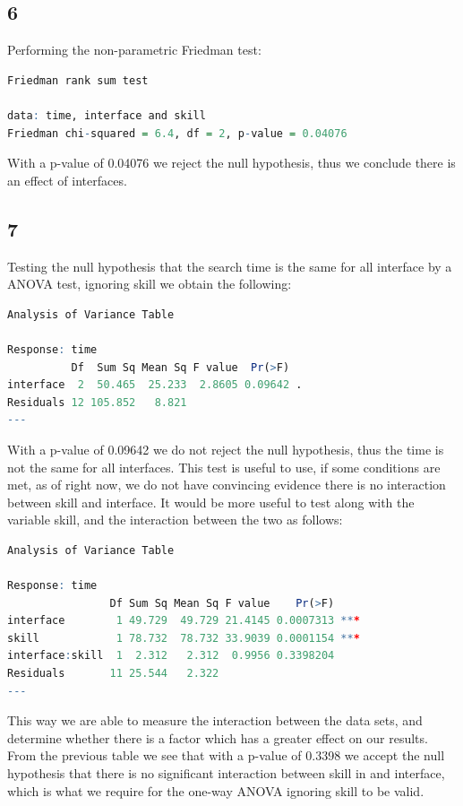 \documentclass{article}
\begin{document}
    \subsection*{6}
    
    Performing the non-parametric Friedman test:
	\begin{lstlisting}[language=R]
Friedman rank sum test

data: time, interface and skill
Friedman chi-squared = 6.4, df = 2, p-value = 0.04076
	\end{lstlisting}
	With a p-value of 0.04076 we reject the null hypothesis, thus we conclude there is an effect of interfaces.
    \subsection*{7}
    Testing the null hypothesis that the search time is the same for all interface by a ANOVA test, ignoring skill we obtain the following:
    \begin{lstlisting}[language=R]
    Analysis of Variance Table

Response: time
          Df  Sum Sq Mean Sq F value  Pr(>F)  
interface  2  50.465  25.233  2.8605 0.09642 .
Residuals 12 105.852   8.821                  
---
	\end{lstlisting}
	With a p-value of 0.09642 we do not reject the null hypothesis, thus the time is not the same for all interfaces.
	This test is useful to use, if some conditions are met, as of right now, we do not have convincing evidence there is no interaction between skill and interface. It would be more useful to test along with the variable skill, and the interaction between the two as follows:
	    \begin{lstlisting}[language=R]
	Analysis of Variance Table

Response: time
                Df Sum Sq Mean Sq F value    Pr(>F)    
interface        1 49.729  49.729 21.4145 0.0007313 ***
skill            1 78.732  78.732 33.9039 0.0001154 ***
interface:skill  1  2.312   2.312  0.9956 0.3398204    
Residuals       11 25.544   2.322                      
---
	\end{lstlisting}
	This way we are able to measure the interaction between the data sets, and determine whether there is a factor which has a greater effect on our results. From the previous table we see that with a p-value of 0.3398 we accept the null hypothesis that there is no significant interaction between skill in and interface, which is what we require for the one-way ANOVA ignoring skill to be valid.
\end{document}
